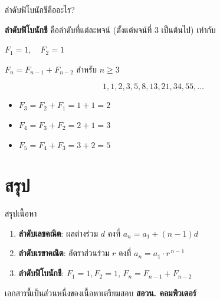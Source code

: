 \documentclass[11pt, aspectratio=169]{beamer}
\begin{document}
\begin{frame}{ลำดับฟิโบนักชีคืออะไร?}
  \begin{explanation}[นิยาม]
    \textbf{ลำดับฟิโบนักชี} คือลำดับที่แต่ละพจน์ (ตั้งแต่พจน์ที่ 3 เป็นต้นไป)
    เท่ากับ 

    \medskip
    $F_1 = 1, \quad F_2 = 1$

    $F_n = F_{n-1} + F_{n-2}$ \quad สำหรับ $n \geq 3$
  \end{explanation}

  \begin{exambox}
    \[
      1, 1, 2, 3, 5, 8, 13, 21, 34, 55, \ldots
    \]

    \medskip
    \begin{itemize}
      \item $F_3 = F_2 + F_1 = 1 + 1 = 2$
      \item $F_4 = F_3 + F_2 = 2 + 1 = 3$
      \item $F_5 = F_4 + F_3 = 3 + 2 = 5$
    \end{itemize}
  \end{exambox}
\end{frame}

\section{สรุป}

\begin{frame}{สรุปเนื้อหา}
  \begin{explanation}[สิ่งที่ได้เรียนรู้]
    \begin{enumerate}
      \item \textbf{ลำดับเลขคณิต}: ผลต่างร่วม $d$ คงที่
        \quad $a_n = a_1 + (n-1)d$

      \item \textbf{ลำดับเรขาคณิต}: อัตราส่วนร่วม $r$ คงที่
        \quad $a_n = a_1 \cdot r^{\,n-1}$

      \item \textbf{ลำดับฟิโบนักชี}: $F_1 = 1, F_2 = 1$,
        $F_n = F_{n-1} + F_{n-2}$
    \end{enumerate}
  \end{explanation}

  \begin{center}
    \large เอกสารนี้เป็นส่วนหนึ่งของเนื้อหาเตรียมสอบ \textbf{สอวน. คอมพิวเตอร์}
  \end{center}
\end{frame}
\end{document}
